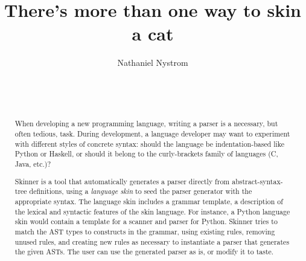 \documentclass[nocopyrightspace,10pt]{sigplanconf}
\newif\ifsigplanconf
\newcommand\eat[1]{}
\begin{document}
\eat{
\conferenceinfo{PPoPP 2014} {February 2014, Orlando, Florida.}
\copyrightyear{2013}
\copyrightdata{}
}

\title{There's more than one way to skin a cat}

\ifsigplanconf

\authorinfo{Nathaniel Nystrom}
   {Faculty of Informatics \\ Universit\`a della Svizzera italiana \\
   Lugano, Switzerland}
   {nate.nystrom@usi.ch}

   \else

\author{
\alignauthor
  Nathaniel Nystrom \\
   \\
   \\
   \\
}

\fi

\vspace{-1cm}
\maketitle

\sloppy



\begin{abstract}
  When developing a new programming language,
  writing a parser
  is a necessary, but often tedious, task.
  During development, a language developer may want to experiment with
  different styles of concrete syntax: should the language be
  indentation-based
  like Python or Haskell,
  or should it belong to the curly-brackets family of languages
  (C, Java, etc.)?

  Skinner is a tool that automatically generates a parser directly 
  from abstract-syntax-tree definitions, using a \emph{language skin}
  to seed the parser generator with the appropriate syntax.
  The language skin includes a grammar template, a
  description of the lexical and syntactic features of the skin language.
  For instance, a Python language skin
  would contain a template for a scanner and parser for Python.
  Skinner tries to match the AST types to
  constructs in the grammar, using existing rules,
  removing unused rules, and
  creating new rules as necessary to instantiate a parser that generates
  the given ASTs. The user can use
  the generated parser as is, or modify it to taste.

\end{abstract}
\end{document}
